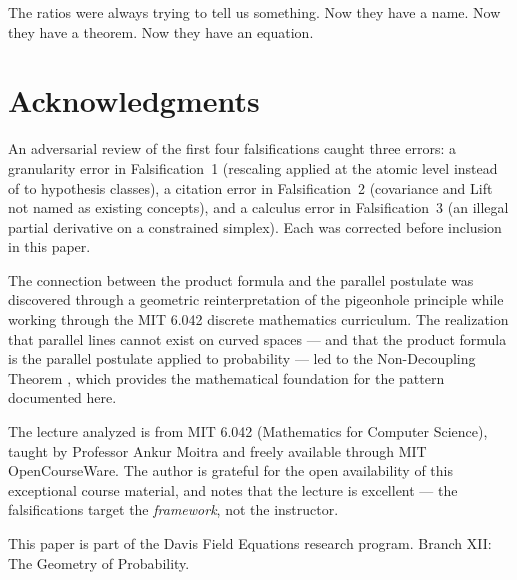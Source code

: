 \documentclass[12pt]{article}
\begin{document}
The ratios were always trying to tell us something. Now they have a name. Now they have a theorem. Now they have an equation.

\section{Acknowledgments}

An adversarial review of the first four falsifications caught three errors: a granularity error in Falsification~1 (rescaling applied at the atomic level instead of to hypothesis classes), a citation error in Falsification~2 (covariance and Lift not named as existing concepts), and a calculus error in Falsification~3 (an illegal partial derivative on a constrained simplex). Each was corrected before inclusion in this paper.

The connection between the product formula and the parallel postulate was discovered through a geometric reinterpretation of the pigeonhole principle while working through the MIT 6.042 discrete mathematics curriculum. The realization that parallel lines cannot exist on curved spaces --- and that the product formula is the parallel postulate applied to probability --- led to the Non-Decoupling Theorem \cite{davis2026nondecoupling}, which provides the mathematical foundation for the pattern documented here.

The lecture analyzed is from MIT 6.042 (Mathematics for Computer Science), taught by Professor Ankur Moitra and freely available through MIT OpenCourseWare. The author is grateful for the open availability of this exceptional course material, and notes that the lecture is excellent --- the falsifications target the \textit{framework}, not the instructor.

This paper is part of the Davis Field Equations research program. Branch XII: The Geometry of Probability.
\end{document}
